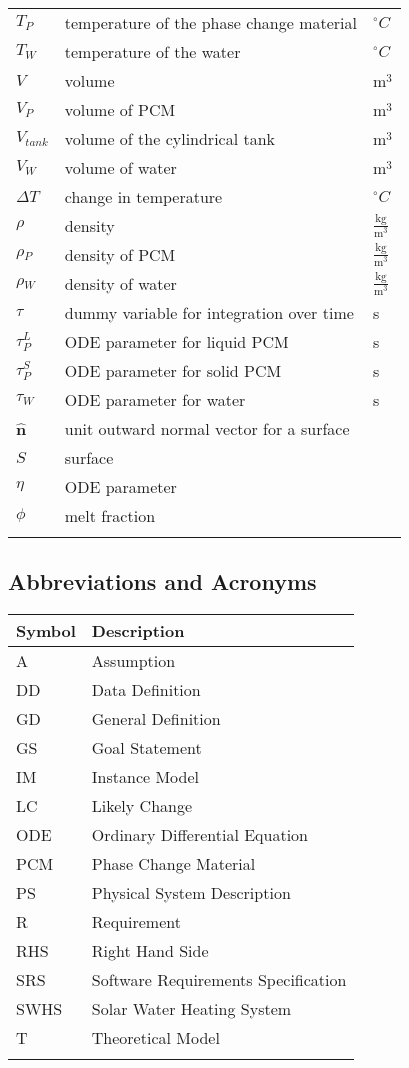 \documentclass[12pt]{article}
\begin{document}
\begin{longtable*}{l l l}
$T_{P}$ & temperature of the phase change material & ${}^{\circ}C$
\\
$T_{W}$ & temperature of the water & ${}^{\circ}C$
\\
$V$ & volume & $\text{m}^{3}$
\\
$V_{P}$ & volume of PCM & $\text{m}^{3}$
\\
$V_{tank}$ & volume of the cylindrical tank & $\text{m}^{3}$
\\
$V_{W}$ & volume of water & $\text{m}^{3}$
\\
$\Delta{}T$ & change in temperature & ${}^{\circ}C$
\\
$\rho{}$ & density & $\frac{\text{kg}}{\text{m}^{3}}$
\\
$\rho{}_{P}$ & density of PCM & $\frac{\text{kg}}{\text{m}^{3}}$
\\
$\rho{}_{W}$ & density of water & $\frac{\text{kg}}{\text{m}^{3}}$
\\
$\tau{}$ & dummy variable for integration over time & s
\\
$\tau{}_{P}^{L}$ & ODE parameter for liquid PCM & s
\\
$\tau{}_{P}^{S}$ & ODE parameter for solid PCM & s
\\
$\tau{}_{W}$ & ODE parameter for water & s
\\
$\mathbf{\hat{n}}$ & unit outward normal vector for a surface & 
\\
$S$ & surface & 
\\
$\eta{}$ & ODE parameter & 
\\
$\phi{}$ & melt fraction & 
\\
\bottomrule
\label{Table:ToS}
\end{longtable*}
\subsection{Abbreviations and Acronyms}
\label{Sec:AaA}
\begin{longtable*}{l l}
\toprule
Symbol & Description
\\
\midrule
A & Assumption
\\
DD & Data Definition
\\
GD & General Definition
\\
GS & Goal Statement
\\
IM & Instance Model
\\
LC & Likely Change
\\
ODE & Ordinary Differential Equation
\\
PCM & Phase Change Material
\\
PS & Physical System Description
\\
R & Requirement
\\
RHS & Right Hand Side
\\
SRS & Software Requirements Specification
\\
SWHS & Solar Water Heating System
\\
T & Theoretical Model
\\
\bottomrule
\label{Table:AaA}
\end{longtable*}
\end{document}
